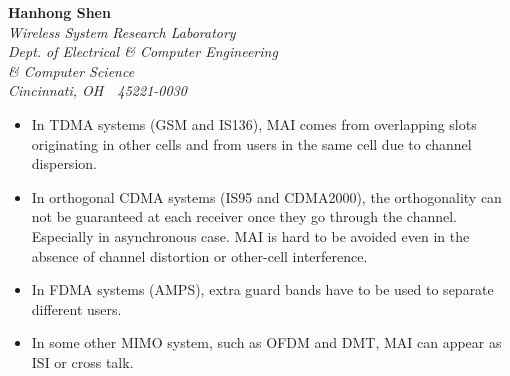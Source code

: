 \documentclass[20pt,landscape]{foils}
\begin{document}
\raggedright \color{white}
\pagecolor{bgcolor} %

\begin{center}
\vspace{.3in}
{\bf Hanhong Shen }  \\
{\it \vspace{0.5in} Wireless System Research Laboratory \\Dept. of Electrical \& Computer Engineering \\
\& Computer Science \\ Cincinnati,
OH~~45221-0030} \\
\vspace{.5in}
\end{center}

\begin{itemize}
\item In TDMA systems (GSM and IS136), MAI comes from overlapping
slots originating in other cells and from users in the same cell
due to channel dispersion.

\item In orthogonal CDMA systems (IS95 and CDMA2000), the
orthogonality can not be guaranteed at each receiver once they go
through the channel. Especially in asynchronous case. MAI is hard
to be avoided even in the absence of channel distortion or
other-cell interference.

\item In FDMA systems (AMPS), extra guard bands have to be used to
separate different users.

\item In some other MIMO system, such as OFDM and DMT, MAI can
appear as ISI or cross talk.
\end{itemize}
\end{document}
